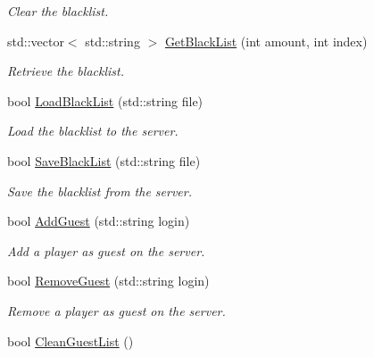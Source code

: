 \begin{DoxyCompactItemize}
\begin{DoxyCompactList}\small\item\em Clear the blacklist. \end{DoxyCompactList}\item 
std\-::vector$<$ std\-::string $>$ \hyperlink{classMethods_a4994686b0a146cd57b01347003d9e390}{Get\-Black\-List} (int amount, int index)
\begin{DoxyCompactList}\small\item\em Retrieve the blacklist. \end{DoxyCompactList}\item 
bool \hyperlink{classMethods_a965d56efe5c04be5f6422b4a84aa195a}{Load\-Black\-List} (std\-::string file)
\begin{DoxyCompactList}\small\item\em Load the blacklist to the server. \end{DoxyCompactList}\item 
bool \hyperlink{classMethods_abcdea5712f34f19770fac20b593b2d38}{Save\-Black\-List} (std\-::string file)
\begin{DoxyCompactList}\small\item\em Save the blacklist from the server. \end{DoxyCompactList}\item 
bool \hyperlink{classMethods_a020ab9aff0adf1b84b39a7db777796e8}{Add\-Guest} (std\-::string login)
\begin{DoxyCompactList}\small\item\em Add a player as guest on the server. \end{DoxyCompactList}\item 
bool \hyperlink{classMethods_a19a4b24a569324b9a6b53d931fca9346}{Remove\-Guest} (std\-::string login)
\begin{DoxyCompactList}\small\item\em Remove a player as guest on the server. \end{DoxyCompactList}\item 
\hypertarget{classMethods_a6ec365a29cdbf37eb9c1f685e79ae2d0}{bool \hyperlink{classMethods_a6ec365a29cdbf37eb9c1f685e79ae2d0}{Clean\-Guest\-List} ()}\label{classMethods_a6ec365a29cdbf37eb9c1f685e79ae2d0}


\end{DoxyCompactItemize}
